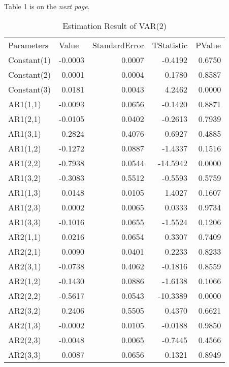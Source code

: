 \documentclass[11pt]{article}
\begin{document}
Table 1 is on the \textit{next page}.

\pagebreak

\begin{table}[htbp]
  \centering
  \caption{Estimation Result of VAR(2)}
    \begin{tabular}{lrrrr}
    Parameters & \multicolumn{1}{l}{Value} & \multicolumn{1}{l}{StandardError} & \multicolumn{1}{l}{TStatistic} & \multicolumn{1}{l}{PValue} \\
    Constant(1) & -0.0003 & 0.0007 & -0.4192 & 0.6750 \\
    Constant(2) & 0.0001 & 0.0004 & 0.1780 & 0.8587 \\
    Constant(3) & 0.0181 & 0.0043 & 4.2462 & 0.0000 \\
    AR{1}(1,1) & -0.0093 & 0.0656 & -0.1420 & 0.8871 \\
    AR{1}(2,1) & -0.0105 & 0.0402 & -0.2613 & 0.7939 \\
    AR{1}(3,1) & 0.2824 & 0.4076 & 0.6927 & 0.4885 \\
    AR{1}(1,2) & -0.1272 & 0.0887 & -1.4337 & 0.1516 \\
    AR{1}(2,2) & -0.7938 & 0.0544 & -14.5942 & 0.0000 \\
    AR{1}(3,2) & -0.3083 & 0.5512 & -0.5593 & 0.5759 \\
    AR{1}(1,3) & 0.0148 & 0.0105 & 1.4027 & 0.1607 \\
    AR{1}(2,3) & 0.0002 & 0.0065 & 0.0333 & 0.9734 \\
    AR{1}(3,3) & -0.1016 & 0.0655 & -1.5524 & 0.1206 \\
    AR{2}(1,1) & 0.0216 & 0.0654 & 0.3307 & 0.7409 \\
    AR{2}(2,1) & 0.0090 & 0.0401 & 0.2233 & 0.8233 \\
    AR{2}(3,1) & -0.0738 & 0.4062 & -0.1816 & 0.8559 \\
    AR{2}(1,2) & -0.1430 & 0.0886 & -1.6138 & 0.1066 \\
    AR{2}(2,2) & -0.5617 & 0.0543 & -10.3389 & 0.0000 \\
    AR{2}(3,2) & 0.2406 & 0.5505 & 0.4370 & 0.6621 \\
    AR{2}(1,3) & -0.0002 & 0.0105 & -0.0188 & 0.9850 \\
    AR{2}(2,3) & -0.0048 & 0.0065 & -0.7445 & 0.4566 \\
    AR{2}(3,3) & 0.0087 & 0.0656 & 0.1321 & 0.8949 \\
    \end{tabular}%
  \label{tab:addlabel}%
\end{table}%
\end{document}
